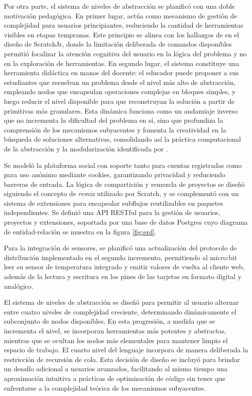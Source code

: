 Por otra parte, el sistema de niveles de abstracción se planificó con una doble motivación pedagógica. En primer lugar, actúa como mecanismo de gestión de complejidad para usuarios principiantes, reduciendo la cantidad de herramientas visibles en etapas tempranas. Este principio se alinea con los hallazgos de  en el diseño de ScratchJr, donde la limitación deliberada de comandos disponibles permitió focalizar la atención cognitiva del usuario en la lógica del problema y no en la exploración de herramientas. En segundo lugar, el sistema constituye una herramienta didáctica en manos del docente: el educador puede proponer a sus estudiantes que resuelvan un problema desde el nivel más alto de abstracción, empleando nodos que encapsulan operaciones complejas en bloques simples, y luego reducir el nivel disponible para que reconstruyan la solución a partir de primitivas más granulares. Esta dinámica funciona como un andamiaje inverso que no incrementa la dificultad del problema en sí, sino que profundiza la comprensión de los mecanismos subyacentes y fomenta la creatividad en la búsqueda de soluciones alternativas, consolidando así la práctica computacional de la abstracción y la modularización identificada por .

Se modeló la plataforma social con soporte tanto para cuentas registradas como para uso anónimo mediante cookies, garantizando privacidad y reduciendo barreras de entrada. La lógica de compartición y remezcla de proyectos se diseñó siguiendo el concepto de \emph{remix} utilizado por Scratch, y se complementó con un sistema de extensiones para encapsular subflujos reutilizables en paquetes independientes. Se definió una API RESTful para la gestión de usuarios, proyectos y extensiones, soportada por una base de datos Postgres cuyo diagrama de entidad-relación se muestra en la figura \ref{fig:erd}.

Para la integración de sensores, se planificó una actualización del protocolo de distribución implementado en el segundo incremento, permitiendo al micro:bit leer su sensor de temperatura integrado y emitir valores de vuelta al cliente web, además de la lectura y escritura en los pines de las tarjetas en formato digital y analógico.

El sistema de niveles de abstracción se diseñó para permitir al usuario alternar entre cuatro niveles de complejidad creciente, determinando dinámicamente el subconjunto de nodos disponibles. En esta progresión, a medida que se incrementa el nivel, se incorporan herramientas más potentes y abstractas, mientras que se ocultan los nodos más elementales para mantener limpio el espacio de trabajo. El cuarto nivel del lenguaje incorpora de manera deliberada la restricción de recursión de cola. Esta decisión de diseño se incluyó para brindar un desafío adicional a usuarios avanzados, facilitando al mismo tiempo una aproximación intuitiva a prácticas de optimización de código sin tener que enfrentarse a la complejidad teórica de los mecanismos subyacentes.


